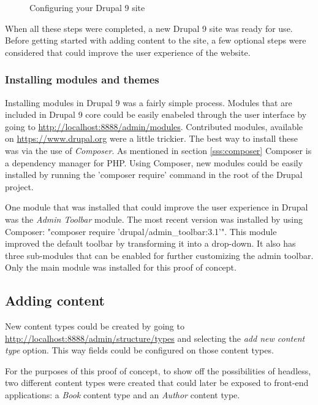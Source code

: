 \begin{enumerate}
\begin{figure}
		\caption[Configuring Drupal 9]{Configuring your Drupal 9 site}
	\end{figure}
\end{enumerate}

When all these steps were completed, a new Drupal 9 site was ready for use. Before getting started with adding content to the site, a few optional steps were considered that could improve the user experience of the website.

\subsubsection{Installing modules and themes}

Installing modules in Drupal 9 was a fairly simple process. Modules that are included in Drupal 9 core could be easily enabeled through the user interface by going to \url{http://localhost:8888/admin/modules}. Contributed modules, available on \url{https://www.drupal.org} were a little trickier. The best way to install these was via the use of \emph{Composer}. As mentioned in section \ref{sss:composer} Composer is a dependency manager for PHP.  Using Composer, new modules could be easily installed by running the 'composer require' command in the root of the Drupal project.

One module that was installed that could improve the user experience in Drupal was the \emph{Admin Toolbar} module. The most recent version was installed by using Composer: "composer require 'drupal/admin\_toolbar:3.1'". This module improved the default toolbar by transforming it into a  drop-down. It also has three sub-modules that can be enabled for further customizing the admin toolbar. Only the main module was installed for this proof of concept.

\subsection{Adding content}

New content types could be created by going to \url{http://localhost:8888/admin/structure/types} and selecting the \emph{add new content type} option. This way fields could be configured on those content types.

For the purposes of this proof of concept, to show off the possibilities of headless, two different content types were created that could later be exposed to front-end applications: a \emph{Book} content type and an \emph{Author} content type.

